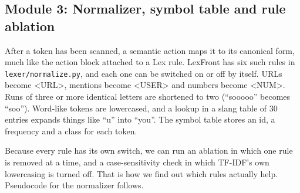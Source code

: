 \documentclass[journal,onecolumn,12pt,a4paper]{IEEEtran}
\begin{document}
\subsection{Module 3: Normalizer, symbol table and rule ablation}\label{sec:3.5}
After a token has been scanned, a semantic action maps it to its canonical form, much like the action block attached to a Lex rule. LexFront has six such rules in \texttt{lexer/\allowbreak{}normalize.py}, and each one can be switched on or off by itself. URLs become \textless{}URL\textgreater{}, mentions become \textless{}USER\textgreater{} and numbers become \textless{}NUM\textgreater{}. Runs of three or more identical letters are shortened to two (``sooooo'' becomes ``soo''). Word-like tokens are lowercased, and a lookup in a slang table of 30 entries expands things like ``u'' into ``you''. The symbol table stores an id, a frequency and a class for each token.

Because every rule has its own switch, we can run an ablation in which one rule is removed at a time, and a case-sensitivity check in which TF-IDF's own lowercasing is turned off. That is how we find out which rules actually help. Pseudocode for the normalizer follows.
\end{document}
